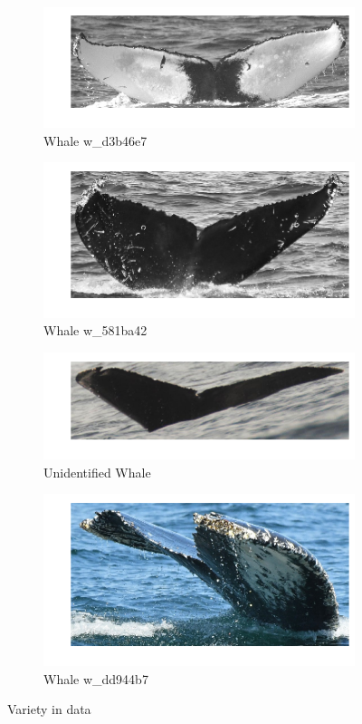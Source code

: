 \begin{figure}[h!]
	\begin{subfigure}{.5\textwidth}
		\includegraphics[width=.7\textwidth]{images/w_d3b46e7.png}
		\caption{Whale w\_d3b46e7}
	\end{subfigure}
	\begin{subfigure}{.5\textwidth}
		\includegraphics[width=.7\textwidth]{images/w_581ba42.png}
		\caption{Whale w\_581ba42}
	\end{subfigure}
	\begin{subfigure}{.5\textwidth}
		\includegraphics[width=.7\textwidth]{images/new_whale.png}
		\caption{Unidentified Whale}
	\end{subfigure}
	\begin{subfigure}{.5\textwidth}
		\includegraphics[width=.7\textwidth]{images/w_dd944b7.png}
		\caption{Whale w\_dd944b7}
	\end{subfigure}
	\caption{\label{fig:whale}Variety in data}
\end{figure}


